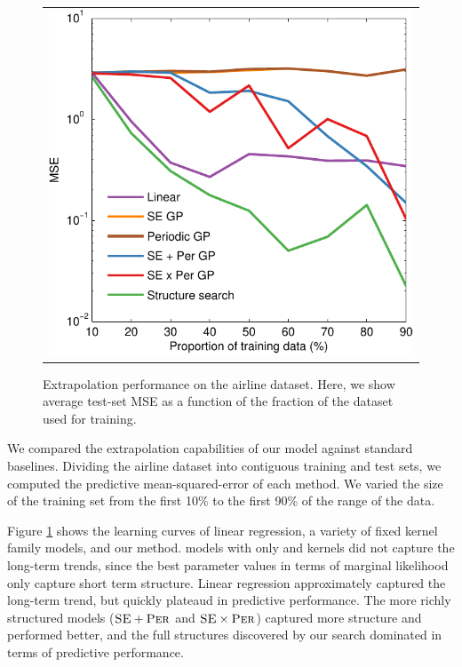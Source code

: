 \documentclass[twoside]{article}
\begin{document}
\begin{figure}[h!]
\centering
\begin{tabular}{c}
\hspace{-0.5cm} \includegraphics[width=0.95\columnwidth]{../figures/extrapolation_curves/01-airline-s-ex-curve_hint.pdf}
\end{tabular}
\caption{Extrapolation performance on the airline dataset.  Here, we show average test-set MSE as a function of the fraction of the dataset used for training. 
}
\label{fig:extrapolation}
\end{figure}

We compared the extrapolation capabilities of our model against standard baselines.  
Dividing the airline dataset into contiguous training and test sets, we computed the predictive mean-squared-error of each method.  
We varied the size of the training set from the first 10\% to the first 90\% of the range of the data.

Figure \ref{fig:extrapolation} shows the learning curves of linear regression, a variety of fixed kernel family \gp{} models, and our method.  
\gp{} models with only \kSE{} and \kPer{} kernels did not capture the long-term trends, since the best parameter values in terms of \gp{} marginal likelihood only capture short term structure.  Linear regression approximately captured the long-term trend, but quickly plateaud in predictive performance.
The more richly structured \gp{} models (${{\textsc{SE}} + {\textsc{Per}}}$ and ${{\textsc{SE}} \times {\textsc{Per}}}$) captured more structure and performed better, and the full structures discovered by our search dominated in terms of predictive performance.
\end{document}
